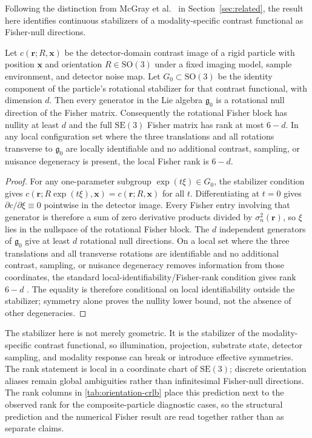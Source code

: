 Following the distinction from McGray et al.~\cite{orientation-precision} in Section~\ref{sec:related}, the result here identifies continuous stabilizers of a modality-specific contrast functional as Fisher-null directions.

\begin{theorem}
\label{thm:symmetry-fisher-rank}
Let $c(\mathbf{r};R,\mathbf{x})$ be the detector-domain contrast image of a rigid particle with position $\mathbf{x}$ and orientation $R\in \mathrm{SO}(3)$ under a fixed imaging model, sample environment, and detector noise map. Let $G_0\subset \mathrm{SO}(3)$ be the identity component of the particle's rotational stabilizer for that contrast functional, with dimension $d$. Then every generator in the Lie algebra $\mathfrak{g}_0$ is a rotational null direction of the Fisher matrix. Consequently the rotational Fisher block has nullity at least $d$ and the full $\mathrm{SE}(3)$ Fisher matrix has rank at most $6-d$. In any local configuration set where the three translations and all rotations transverse to $\mathfrak{g}_0$ are locally identifiable and no additional contrast, sampling, or nuisance degeneracy is present, the local Fisher rank is $6-d$.
\end{theorem}

\begin{proof}
For any one-parameter subgroup $\exp(t\xi)\in G_0$, the stabilizer condition gives $c(\mathbf{r};R\exp(t\xi),\mathbf{x})=c(\mathbf{r};R,\mathbf{x})$ for all $t$. Differentiating at $t=0$ gives $\partial c/\partial \xi\equiv 0$ pointwise in the detector image. Every Fisher entry involving that generator is therefore a sum of zero derivative products divided by $\sigma_n^2(\mathbf{r})$, so $\xi$ lies in the nullspace of the rotational Fisher block. The $d$ independent generators of $\mathfrak{g}_0$ give at least $d$ rotational null directions. On a local set where the three translations and all transverse rotations are identifiable and no additional contrast, sampling, or nuisance degeneracy removes information from those coordinates, the standard local-identifiability/Fisher-rank condition gives rank $6-d$ \cite{rothenberg-identification,orientation-precision}. The equality is therefore conditional on local identifiability outside the stabilizer; symmetry alone proves the nullity lower bound, not the absence of other degeneracies.
\end{proof}

The stabilizer here is not merely geometric. It is the stabilizer of the modality-specific contrast functional, so illumination, projection, substrate state, detector sampling, and modality response can break or introduce effective symmetries. The rank statement is local in a coordinate chart of $\mathrm{SE}(3)$; discrete orientation aliases remain global ambiguities rather than infinitesimal Fisher-null directions. The rank columns in \cref{tab:orientation-crlb} place this prediction next to the observed rank for the composite-particle diagnostic cases, so the structural prediction and the numerical Fisher result are read together rather than as separate claims.

